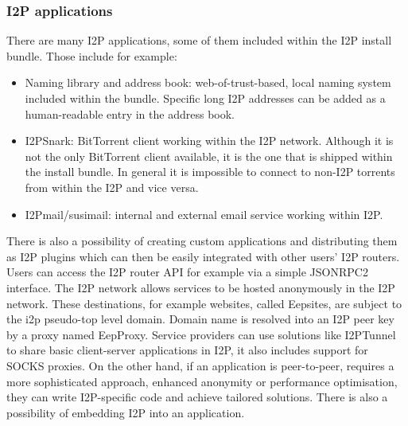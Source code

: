 \subsubsection{I2P applications}
There are many I2P applications, some of them included within the I2P install bundle. Those include for example:
\begin{itemize}
    \item Naming library and address book: web-of-trust-based, local naming system included within the bundle. Specific long I2P addresses can be added as a human-readable entry in the address book.
    \item I2PSnark: BitTorrent client working within the I2P network. Although it is not the only BitTorrent client available, it is the one that is shipped within the install bundle. In general it is impossible to connect to non-I2P torrents from within the I2P and vice versa.
    \item I2Pmail/susimail: internal and external email service working within I2P.
\end{itemize}
There is also a possibility of creating custom applications and distributing them as I2P plugins which can then be easily integrated with other users’ I2P routers. Users can access the I2P router API for example via a simple JSONRPC2 interface. 
The I2P network allows services to be hosted anonymously in the I2P network. These destinations, for example websites, called Eepsites, are subject to the i2p pseudo-top level domain. Domain name is resolved into an I2P peer key by a proxy named EepProxy. Service providers can use solutions like I2PTunnel to share basic client-server applications in I2P, it also includes support for SOCKS proxies. On the other hand, if an application is peer-to-peer, requires a more sophisticated approach, enhanced anonymity or performance optimisation, they can write I2P-specific code and achieve tailored solutions. There is also a possibility of embedding I2P into an application.

